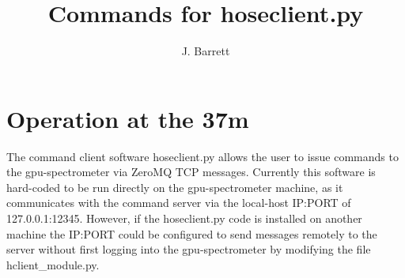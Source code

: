\documentclass[a4paper,14pt]{article}
\title{Commands for hoseclient.py}
\author{J. Barrett}
\begin{document}
\maketitle


\section{Operation at the 37m}

The command client software hoseclient.py allows the user to issue commands to the gpu-spectrometer via ZeroMQ TCP messages. Currently this software is hard-coded to be run directly on the gpu-spectrometer machine,
as it communicates with the command server via the local-host IP:PORT of 127.0.0.1:12345. However, if the hoseclient.py code is installed on another machine the IP:PORT could be configured to send messages remotely to the server
without first logging into the gpu-spectrometer by modifying the file hclient\_module.py.
\end{document}
